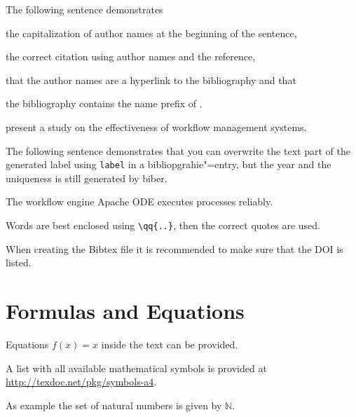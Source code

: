 The following sentence demonstrates
\begin{inparaenum}[1.]
  \item the capitalization of author names at the beginning of the sentence,
  \item the correct citation using author names and the reference,
  \item that the author names are a hyperlink to the bibliography and that
  \item the bibliography contains the name prefix  of .
\end{inparaenum}

\begin{filecontents*}{\democodefile}
 present a study on the effectiveness of workflow management systems.
\end{filecontents*}

The following sentence demonstrates that you can overwrite the text part of the generated label using \texttt{label} in a bibliopgrahie"=entry, but the year and the uniqueness is still generated by biber.

\begin{filecontents*}{\democodefile}
The workflow engine Apache ODE \cite{ApacheODE} executes \BPEL processes reliably.
\end{filecontents*}

\begin{filecontents*}{\democodefile}
Words are best enclosed using \texttt{\textbackslash qq\{..\}}, then the correct quotes are used.
\end{filecontents*}

When creating the Bibtex file it is recommended to make sure that the DOI is listed.

\section{Formulas and Equations}
\label{sec:mf}

\begin{filecontents*}{\democodefile}
Equations $f(x)=x$ inside the text can be provided.
\end{filecontents*}

A list with all available mathematical symbols is provided at \url{http://texdoc.net/pkg/symbols-a4}.

\begin{filecontents*}{\democodefile}
As example the set of natural numbers is given by $\mathbb{N}$.
\end{filecontents*}

